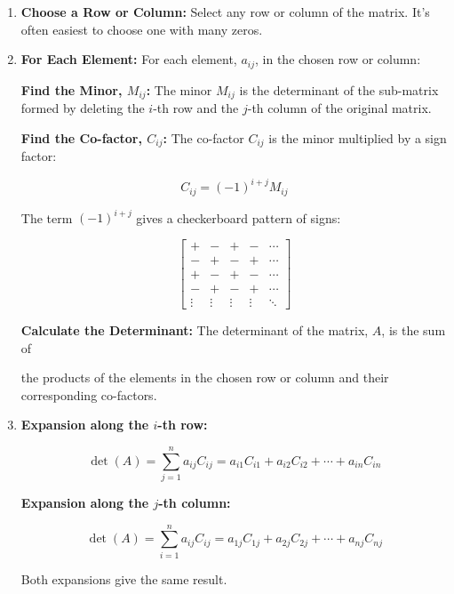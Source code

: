 \begin{enumerate}

    \item \textbf{Choose a Row or Column:} Select any row or column of the matrix. It's often easiest to choose one with many zeros.

    \item \textbf{For Each Element:} For each element, \(a_{ij}\), in the chosen row or column:

    \subitem \textbf{Find the Minor, \(M_{ij}\):}  The minor \(M_{ij}\) is the determinant of the sub-matrix formed by deleting the \(i\)-th 
    row and the \(j\)-th column of the original matrix.

    \subitem \textbf{Find the Co-factor, \(C_{ij}\):} The co-factor \(C_{ij}\) is the minor multiplied by a sign factor:

    \[
        C_{ij} = {(-1)}^{i+j} M_{ij}
    \]

    The term  \({(-1)}^{i+j}\)  gives a checkerboard pattern of signs:

    \[
        \begin{bmatrix}
            +      & -      & +      & -      & \cdots \\
            -      & +      & -      & +      & \cdots \\
            +      & -      & +      & -      & \cdots \\
            -      & +      & -      & +      & \cdots \\
            \vdots & \vdots & \vdots & \vdots & \ddots
        \end{bmatrix}
    \]

    \subitem \textbf{ Calculate the Determinant:} The determinant of the matrix, \(A\), is the sum of
    
    the products of the elements in the chosen row or column and their corresponding co-factors.

    \item \textbf{Expansion along the \(i\)-th row:}
    
    \[
        \det(A) = \sum_{j=1}^{n} a_{ij} C_{ij} = a_{i1}C_{i1} + a_{i2}C_{i2} + \cdots + a_{in}C_{in}
    \]
    
    \textbf{Expansion along the \(j\)-th column:}

    \[
        \det(A) = \sum_{i=1}^{n} a_{ij} C_{ij} = a_{1j}C_{1j} + a_{2j}C_{2j} + \cdots + a_{nj}C_{nj}
    \]

    Both expansions give the same result.

\end{enumerate}


